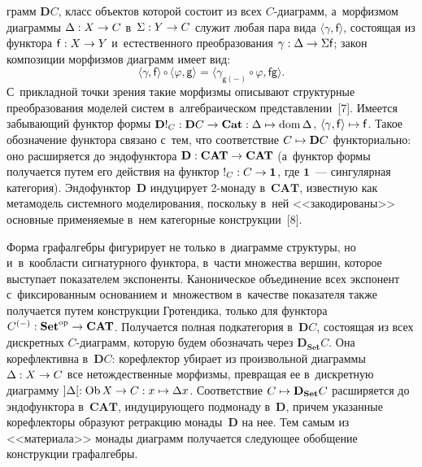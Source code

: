 \begin{multicols}{2}
\noindent
грамм $\mathbf{D}C$, класс 
объектов которой состоит из всех \mbox{$C$-диа}\-грамм, а~морфизмом диаграммы 
$\Delta : X \hm\to C$ в~$\Sigma : Y \hm\to C$ служит любая пара вида 
$\langle\gamma, \mathsf {f}\rangle$, состоящая из функтора $\mathsf {f} : X 
\hm\to Y$ и~естественного преобразования $\gamma : \Delta \hm\to 
\Sigma\mathsf {f}$; закон композиции морфизмов диаграмм имеет вид:
$$
\langle \gamma, \mathsf {f}\rangle \circ \langle\varphi, \mathsf {g}\rangle = \langle 
\gamma_{\mathsf {g}(-)} \circ \varphi, \mathsf {fg}\rangle.
$$
 С~при\-клад\-ной точ\-ки 
зрения такие морфизмы описывают структурные преобразования моделей\linebreak 
сис\-тем в~алгебраическом пред\-став\-ле\-нии~[7]. Имеется забывающий функтор 
формы $\mathbf{D}!_{C} : \mathbf{D}C\hm\to \mathbf{Cat} : \Delta \mapsto  
\mathrm{dom}\,\Delta$, $\langle \gamma, \mathsf {f}\rangle \hm\mapsto 
\mathsf {f}$. Такое обозначение функтора связано с~тем, что соответствие 
$C\hm\mapsto \mathbf{D}C$ функториально: оно расширяется до эндофунктора 
$\mathbf{D} : \mathbf{CAT}\hm\to \mathbf{CAT}$ (а~функтор формы 
получается путем его действия на функтор $!_{C} : C \hm\to \mathbf{1}$, где 
$\mathbf{1}$~--- сингулярная категория). Эндофунктор~$\mathbf{D}$ 
индуцирует 2-мо\-на\-ду в~$\mathbf{CAT}$, известную как метамодель 
системного моделирования, поскольку в~ней <<закодированы>> основ\-ные 
применяемые в~нем категорные конструкции~[8].
     
     Форма графалгебры фигурирует не только в~диаграмме структуры, но 
и~в~ко\-об\-ласти сигнатурного функтора, в~час\-ти множества вершин, которое\linebreak 
выступает показателем экспоненты. Каноническое объединение всех экспонент 
с~фиксированным основанием и~множеством в~качестве показателя так\-же 
получается путем конструкции \mbox{Гротендика}, только для функтора  
$C^{(-)}: \mathbf{Set}^{\mathrm{op}}\hm\to \mathbf{CAT}$. Получается полная подкатегория 
в~$\mathbf{D}C$, со\-сто\-ящая из всех дискретных $C$-диа\-грамм, которую будем 
обозначать через $\mathbf{D}_{\mathbf{Set}}C$. Она корефлективна 
в~$\mathbf{D}C$: корефлектор убирает из произвольной диаграммы $\Delta : 
X\hm\to  C$ все не\-тож\-дест\-вен\-ные морфизмы,  превращая ее в~дискретную 
диаграмму $]\Delta[ : \mathrm{Ob}\,X \hm\to C : x \hm\mapsto \Delta x$. 
Соответствие $C\hm\mapsto \mathbf{D}_{\mathbf{Set}}C$ расширяется до 
эндофунктора в~$\mathbf{CAT}$, ин\-ду\-ци\-ру\-юще\-го подмонаду в~$\mathbf{D}$, 
причем указанные корефлекторы образуют ретракцию монады~$\mathbf{D}$ на 
нее.
     Тем самым из <<материала>> монады диаграмм получается следующее 
обобщение конструкции графалгебры.
     

\end{multicols}
